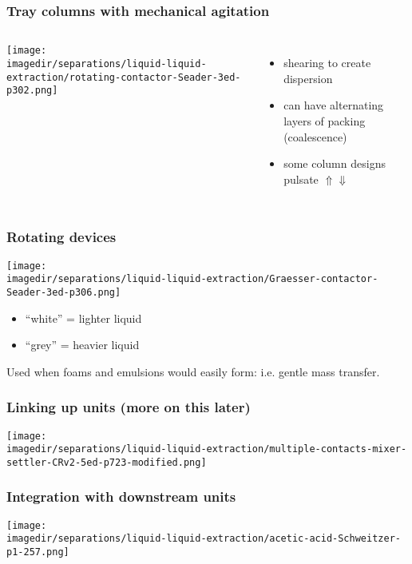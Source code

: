 \begin{frame}\frametitle{Tray columns with mechanical agitation}
	\begin{columns}[t]
			\begin{center}
				\texttt{[image: \\imagedir/separations/liquid-liquid-extraction/rotating-contactor-Seader-3ed-p302.png]}
			\end{center}
			
			\begin{itemize}
				\item	shearing to create dispersion
				\item	can have alternating layers of packing (coalescence)
				\item	some column designs pulsate $\Uparrow \Downarrow$
			\end{itemize}
	\end{columns}
\end{frame}

\begin{frame}\frametitle{Rotating devices}
	\begin{center}
		\texttt{[image: \\imagedir/separations/liquid-liquid-extraction/Graesser-contactor-Seader-3ed-p306.png]}
	\end{center}
	\vspace{-12pt}
	\begin{itemize}
		\item	``white'' = lighter liquid
		\item	``grey'' = heavier liquid
	\end{itemize}
	Used when foams and emulsions would easily form: i.e. gentle mass transfer.
\end{frame}

\begin{frame}\frametitle{Linking up units (more on this later)}
	\begin{center}
		\texttt{[image: \\imagedir/separations/liquid-liquid-extraction/multiple-contacts-mixer-settler-CRv2-5ed-p723-modified.png]}
	\end{center}
\end{frame}

\begin{frame}\frametitle{Integration with downstream units}
	\begin{center}
		\texttt{[image: \\imagedir/separations/liquid-liquid-extraction/acetic-acid-Schweitzer-p1-257.png]}
	\end{center}
	\vspace{-10pt}
\end{frame}

